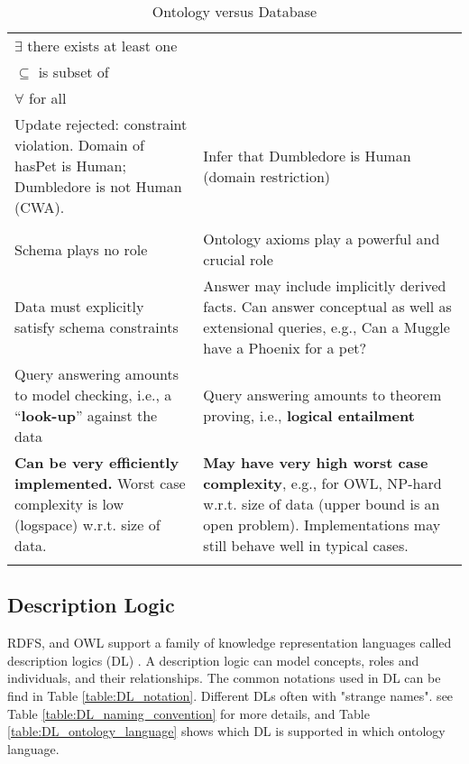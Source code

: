 \begin{longtable}[ht]{| p{65mm} | p{65mm} |}
\multicolumn{2}{|l|}{$\exists$ there exists at least one}\\
\multicolumn{2}{|l|}{$\subseteq$ is subset of}\\
\multicolumn{2}{|l|}{$\forall$ for all}\\
\hline
Update rejected: constraint violation. Domain of hasPet is Human; Dumbledore is not Human (CWA). &
Infer that Dumbledore is Human (domain restriction)\\ 
\hline
\rowcolor{green} \multicolumn{2}{|c|}{Query Answering Mechanism}\\
\hline
Schema plays no role & Ontology axioms play a powerful and crucial role\\
Data must explicitly satisfy schema constraints & Answer may include implicitly derived facts. Can answer conceptual as well as extensional queries, e.g., Can a Muggle have a Phoenix for a pet?\\ 
Query answering amounts to model checking, i.e., a “\textbf{look-up}” against the data & Query answering amounts to theorem proving, i.e., \textbf{logical entailment}\\ 
\textbf{Can be very efficiently implemented.} Worst case complexity is low (logspace) w.r.t. size of data. & \textbf{May have very high worst case complexity}, e.g., for OWL, NP-hard w.r.t. size of data
(upper bound is an open problem). Implementations may still behave well in typical cases.\\ 
\hline
\caption{Ontology versus Database}
\label{table:ontology_vs_database}
\end{longtable}

\subsection{Description Logic}
\label{sec:DL}

RDFS, and OWL support a family of knowledge representation languages called description logics (DL) \cite{DLExample}. A description logic can model concepts, roles and individuals, and their relationships. The common notations used in DL can be find in Table \ref{table:DL_notation}. Different DLs often with "strange names". see Table \ref{table:DL_naming_convention}
for more details, and Table \ref{table:DL_ontology_language} shows which DL is supported in which ontology language.

